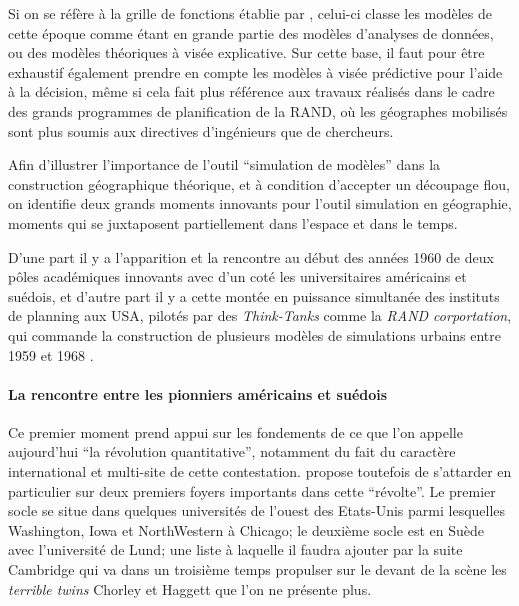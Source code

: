 Si on se réfère à la grille de fonctions établie par \autocite{Varenne2014}, celui-ci classe les modèles de cette époque comme étant en grande partie des modèles d'analyses de données, ou des modèles théoriques à visée explicative. Sur cette base, il faut pour être exhaustif également prendre en compte les modèles à visée prédictive pour l'aide à la décision, même si cela fait plus référence aux travaux réalisés dans le cadre des grands programmes de planification de la RAND, où les géographes mobilisés sont plus soumis aux directives d'ingénieurs que de chercheurs.


Afin d'illustrer l'importance de l'outil \enquote{simulation de modèles} dans la construction géographique théorique, et à condition d'accepter un découpage flou, on identifie deux grands moments innovants pour l'outil simulation en géographie, moments qui se juxtaposent partiellement dans l'espace et dans le temps.

D'une part il y a l'apparition et la rencontre au début des années 1960 de deux pôles académiques innovants avec d'un coté les universitaires américains et suédois, et d'autre part il y a cette montée en puissance simultanée des instituts de planning aux USA, pilotés par des \textit{Think-Tanks} comme la \textit{RAND corportation}, qui commande la construction de plusieurs modèles de simulations urbains entre 1959 et 1968 \autocite[307]{Batty1976}. 

\paragraph{La rencontre entre les pionniers américains et suédois}

Ce premier moment prend appui sur les fondements de ce que l'on appelle aujourd'hui \enquote{la révolution quantitative}, notamment du fait du caractère international et multi-site de cette contestation. \textcite{Gould2004} propose toutefois de s'attarder en particulier sur deux premiers foyers importants dans cette \enquote{révolte}. Le premier socle se situe dans quelques universités de l'ouest des Etats-Unis \autocite{Gould2004} parmi lesquelles Washington, Iowa et NorthWestern à Chicago; le deuxième socle est en Suède avec l'université de Lund; une liste à laquelle il faudra ajouter par la suite Cambridge qui va dans un troisième temps propulser sur le devant de la scène les \textit{terrible twins} Chorley et Haggett que l'on ne présente plus.

